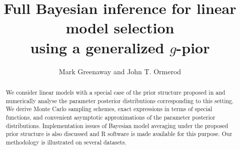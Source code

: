 \documentclass{article}[12pt]
\begin{document}


\title{Full Bayesian inference for linear model selection \\ using a generalized $g$-pior}

\author{Mark Greenaway
	and
	John T. Ormerod
}



\maketitle


\begin{abstract}
\noindent 
We consider linear models with a special case of the prior structure proposed in \cite{Maruyama2011} and numerically analyse the parameter posterior distributions corresponding to this setting.  
We derive Monte Carlo sampling schemes, exact expressions in terms of special functions, and convenient asymptotic approximations of the parameter posterior distributions. 
Implementation issues of Bayesian model averaging under the proposed prior structure is also discussed 
and R software is made available for this purpose. Our methodology is illustrated on several datasets.
\end{abstract}
\end{document}
